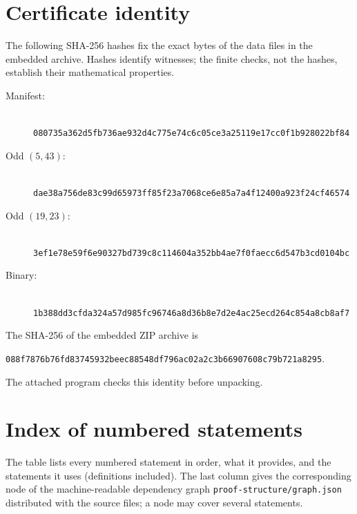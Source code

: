 \documentclass[11pt]{article}
\theoremstyle{definition}
\theoremstyle{remark}
\begin{document}
\section{Certificate identity}\label{app:hashes}
The following SHA-256 hashes fix the exact bytes of the data files in the
embedded archive. Hashes identify witnesses; the finite checks, not the
hashes, establish their mathematical properties.
\begin{description}
\item[Manifest:] \\
\nolinkurl{080735a362d5fb736ae932d4c775e74c6c05ce3a25119e17cc0f1b928022bf84}
\item[Odd $(5,43)$:] \\
\nolinkurl{dae38a756de83c99d65973ff85f23a7068ce6e85a7a4f12400a923f24cf46574}
\item[Odd $(19,23)$:] \\
\nolinkurl{3ef1e78e59f6e90327bd739c8c114604a352bb4ae7f0faecc6d547b3cd0104bc}
\item[Binary:] \\
\nolinkurl{1b388dd3cfda324a57d985fc96746a8d36b8e7d2e4ac25ecd264c854a8cb8af7}
\end{description}
The SHA-256 of the embedded ZIP archive is
\begin{center}\small
\nolinkurl{088f7876b76fd83745932beec88548df796ac02a2c3b66907608c79b721a8295}.
\end{center}
The attached program checks this identity before unpacking.

\section{Index of numbered statements}\label{app:index}
The table lists every numbered statement in order, what it provides, and the
statements it uses (definitions included). The last column gives the
corresponding node of the machine-readable dependency graph
\texttt{proof-structure/graph.json} distributed with the source files; a node
may cover several statements.
\end{document}
